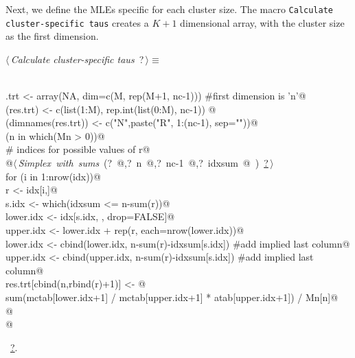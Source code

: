 \documentclass[reqno]{amsart}
\renewcommand{\NWtarget}[2]{\hypertarget{#1}{#2}}
\renewcommand{\NWlink}[2]{\hyperlink{#1}{#2}}
\begin{document}
Next, we define the MLEs specific for each cluster size. The macro \texttt{Calculate cluster-specific taus}
creates a $K+1$ dimensional array, with the cluster size as the first dimension.

\begin{flushleft} \small\label{scrap13}\raggedright\small
\NWtarget{nuweb?}{} $\langle\,${\itshape Calculate cluster-specific taus}\nobreak\ {\footnotesize {?}}$\,\rangle\equiv$
\vspace{-1ex}
\begin{list}{}{} \item
\mbox{}\verb@@\\
\mbox{}\verb@res.trt <- array(NA, dim=c(M, rep(M+1, nc-1))) #first dimension is 'n'@\\
\mbox{}\verb@dimnames(res.trt) <- c(list(1:M), rep.int(list(0:M), nc-1)) @\\
\mbox{}\verb@names(dimnames(res.trt)) <- c("N",paste("R", 1:(nc-1), sep=""))@\\
\mbox{}\verb@for (n in which(Mn > 0)){@\\
\mbox{}\verb@  # indices for possible values of r@\\
\mbox{}\verb@  @\hbox{$\langle\,${\itshape Simplex with sums}\nobreak\ ({\footnotesize ?\label{scrap14}
 }\mbox{}\verb@idx @,{\footnotesize ?\label{scrap15}
 }\mbox{}\verb@ n @,{\footnotesize ?\label{scrap16}
 }\mbox{}\verb@ nc-1 @,{\footnotesize ?\label{scrap17}
 }\mbox{}\verb@ idxsum @ ) {\footnotesize \NWlink{nuweb?}{?}}$\,\rangle$}\verb@@\\
\mbox{}\verb@  for (i in 1:nrow(idx)){@\\
\mbox{}\verb@    r <- idx[i,]@\\
\mbox{}\verb@    s.idx <- which(idxsum <= n-sum(r))@\\
\mbox{}\verb@    lower.idx <- idx[s.idx, , drop=FALSE]@\\
\mbox{}\verb@    upper.idx <- lower.idx + rep(r, each=nrow(lower.idx))@\\
\mbox{}\verb@    lower.idx <- cbind(lower.idx, n-sum(r)-idxsum[s.idx])   #add implied last column@\\
\mbox{}\verb@    upper.idx <- cbind(upper.idx, n-sum(r)-idxsum[s.idx])   #add implied last column@\\
\mbox{}\verb@    res.trt[cbind(n,rbind(r)+1)] <- @\\
\mbox{}\verb@      sum(mctab[lower.idx+1] / mctab[upper.idx+1] * atab[upper.idx+1]) / Mn[n]@\\
\mbox{}\verb@  }@\\
\mbox{}\verb@}@\\
\mbox{}\verb@@{\NWsep}
\end{list}
\vspace{-1.5ex}
\footnotesize
\begin{list}{}{\setlength{\itemsep}{-\parsep}\setlength{\itemindent}{-\leftmargin}}
\item \NWtxtMacroRefIn\ \NWlink{nuweb?}{?}.

\item{}
\end{list}
\vspace{4ex}
\end{flushleft}
\end{document}
